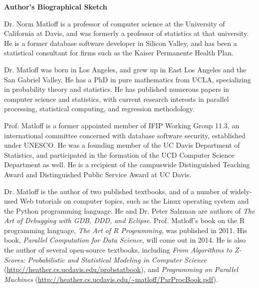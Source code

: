\begin{center}
{\bf Author's Biographical Sketch}
\end{center}

Dr. Norm Matloff is a professor of computer science at the University of
California at Davis, and was formerly a professor of statistics at that
university. He is a former database software developer in Silicon
Valley, and has been a statistical consultant for firms such as the
Kaiser Permanente Health Plan.

Dr. Matloff was born in Los Angeles, and grew up in East Los Angeles and
the San Gabriel Valley. He has a PhD in pure mathematics from UCLA,
specializing in probability theory and statistics.  He has published
numerous papers in computer science and statistics, with current
research interests in parallel processing, statistical computing,
and regression methodology.

Prof. Matloff is a former appointed member of IFIP Working Group 11.3,
an international committee concerned with database software security,
established under UNESCO.  He was a founding member of the UC Davis
Department of Statistics, and participated in the formation of the UCD
Computer Science Department as well.  He is a recipient of the
campuswide Distinguished Teaching Award and Distinguished Public Service
Award at UC Davis.

Dr. Matloff is the author of two published textbooks, and of a number of
widely-used Web tutorials on computer topics, such as the Linux
operating system and the Python programming language.  He and Dr. Peter
Salzman are authors of {\it The Art of Debugging with GDB, DDD, and
Eclipse}. Prof.  Matloff's book on the R programming language, {\it The
Art of R Programming}, was published in 2011.  His book, {\it Parallel
Computation for Data Science}, will come out in 2014.  He is also the
author of several open-source textbooks, including {\it From Algorithms
to Z-Scores: Probabilistic and Statistical Modeling in Computer Science}
(\url{http://heather.cs.ucdavis.edu/probstatbook}), and
{\it Programming on Parallel Machines} 
(\url{http://heather.cs.ucdavis.edu/~matloff/ParProcBook.pdf}).
